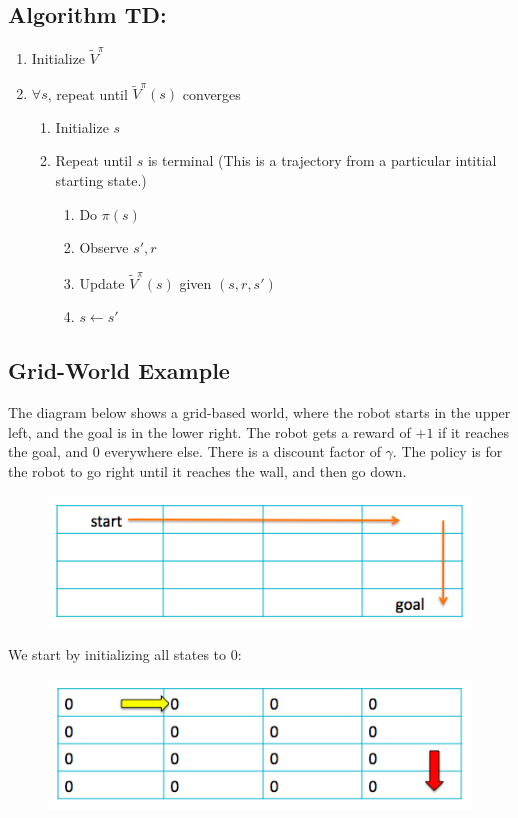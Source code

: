 \documentclass[11pt]{article}
\numberwithin{equation}{section}
\numberwithin{figure}{section}
\begin{document}
\subsection*{Algorithm TD:}
\begin{enumerate}
	\item Initialize $\tilde{V}^\pi$
	\item $\forall s$, repeat until $\tilde{V}^\pi(s)$ converges
	\begin{enumerate}
		\item Initialize $s$
		\item Repeat until $s$ is terminal (This is a trajectory from a particular intitial starting state.)
		\begin{enumerate}
			\item Do $\pi(s)$
			\item Observe $s', r$
			\item Update $\tilde{V}^\pi(s)$ given  $(s, r, s')$
			\label{step.updateTD}
			\item $s \leftarrow s'$
		\end{enumerate}		
	\end{enumerate}		
\end{enumerate}		

\subsection*{Grid-World Example}
The diagram below shows a grid-based world, where the robot starts in the upper left, and the goal is in the lower right.  The robot gets a reward of $+1$ if it reaches the goal, and $0$ everywhere else.  There is a discount factor of $\gamma$.  The policy is for the robot to go right until it reaches the wall, and then go down.
\begin{figure}[h!]
	\centering
	\includegraphics[width=.4\columnwidth]{./images/fig1}
	\label{fig.fig1}
\end{figure}

We start by initializing all states to 0:

\begin{figure}[h!]
	\centering
	\includegraphics[width=.4\columnwidth]{./images/fig2}
	\label{fig.fig2}
\end{figure}
\end{document}
